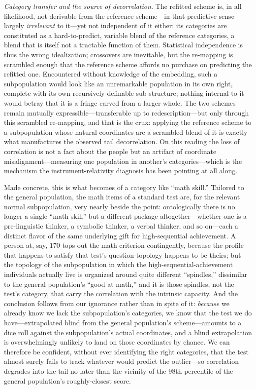 \documentclass{article}
\begin{document}
\emph{Category transfer and the source of decorrelation.} The refitted scheme is, in all likelihood, not derivable from the reference scheme---in that predictive sense largely \emph{irrelevant} to it---yet not independent of it either: its categories are constituted as a hard-to-predict, variable blend of the reference categories, a blend that is itself not a tractable function of them. Statistical independence is thus the wrong idealization; crossovers are inevitable, but the re-mapping is scrambled enough that the reference scheme affords no purchase on predicting the refitted one. Encountered without knowledge of the embedding, such a subpopulation would look like an unremarkable population in its own right, complete with its own recursively definable sub-structure; nothing internal to it would betray that it is a fringe carved from a larger whole. The two schemes remain mutually expressible---transferable up to redescription---but only through this scrambled re-mapping, and that is the crux: applying the reference scheme to a subpopulation whose natural coordinates are a scrambled blend of it is exactly what manufactures the observed tail decorrelation. On this reading the loss of correlation is not a fact about the people but an artifact of coordinate misalignment---measuring one population in another's categories---which is the mechanism the instrument-relativity diagnosis has been pointing at all along.

Made concrete, this is what becomes of a category like ``math skill.'' Tailored to the general population, the math items of a standard test are, for the relevant normal subpopulation, very nearly beside the point: ontologically there is no longer a single ``math skill'' but a different package altogether---whether one is a pre-linguistic thinker, a symbolic thinker, a verbal thinker, and so on---each a distinct flavor of the same underlying gift for high-sequential achievement. A person at, say, $170$ tops out the math criterion contingently, because the profile that happens to satisfy that test's question-topology happens to be theirs; but the topology of the subpopulation in which the high-sequential-achievement individuals actually live is organized around quite different ``spindles,'' dissimilar to the general population's ``good at math,'' and it is those spindles, not the test's category, that carry the correlation with the intrinsic capacity. And the conclusion follows from our ignorance rather than in spite of it: \emph{because} we already know we lack the subpopulation's categories, we know that the test we do have---extrapolated blind from the general population's scheme---amounts to a dice roll against the subpopulation's actual coordinates, and a blind extrapolation is overwhelmingly unlikely to land on those coordinates by chance. We can therefore be confident, without ever identifying the right categories, that the test almost surely fails to track whatever would predict the outlier---so correlation degrades into the tail no later than the vicinity of the $98$th percentile of the general population's roughly-closest score.
\end{document}
